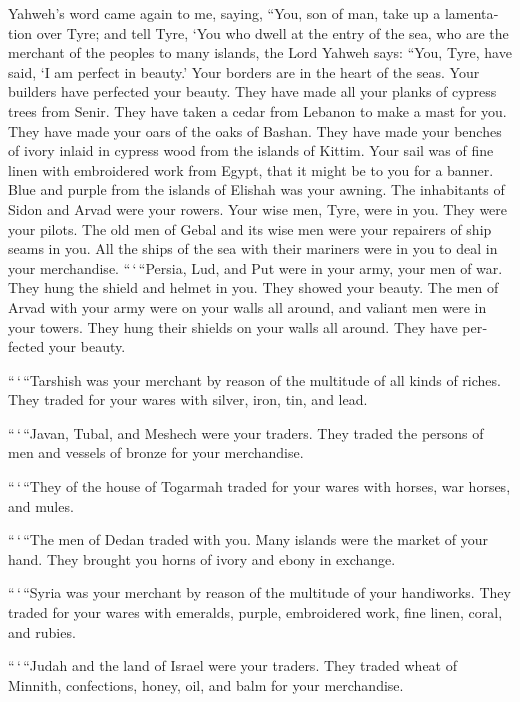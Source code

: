\begin{paracol}{2}
\begin{otherlanguage}{english}
 Yahweh's word came again to me, saying, 
``You, son of man, take up a lamentation over Tyre;  and
tell Tyre, `You who dwell at the entry of the sea, who are the merchant
of the peoples to many islands, the Lord Yahweh says: ``You, Tyre, have
said, `I am perfect in beauty.'  Your borders are in the
heart of the seas. Your builders have perfected your beauty.
 They have made all your planks of cypress trees from
Senir. They have taken a cedar from Lebanon to make a mast for you.
 They have made your oars of the oaks of Bashan. They have
made your benches of ivory inlaid in cypress wood from the islands of
Kittim.  Your sail was of fine linen with embroidered work
from Egypt, that it might be to you for a banner. Blue and purple from
the islands of Elishah was your awning.  The inhabitants
of Sidon and Arvad were your rowers. Your wise men, Tyre, were in you.
They were your pilots.  The old men of Gebal and its wise
men were your repairers of ship seams in you. All the ships of the sea
with their mariners were in you to deal in your merchandise.
 ``\,`\,``Persia, Lud, and Put were in your army, your
men of war. They hung the shield and helmet in you. They showed your
beauty.  The men of Arvad with your army were on your
walls all around, and valiant men were in your towers. They hung their
shields on your walls all around. They have perfected your beauty.

 ``\,`\,``Tarshish was your merchant by reason of the
multitude of all kinds of riches. They traded for your wares with
silver, iron, tin, and lead.

 ``\,`\,``Javan, Tubal, and Meshech were your traders.
They traded the persons of men and vessels of bronze for your
merchandise.

 ``\,`\,``They of the house of Togarmah traded for your
wares with horses, war horses, and mules.

 ``\,`\,``The men of Dedan traded with you. Many islands
were the market of your hand. They brought you horns of ivory and ebony
in exchange.

 ``\,`\,``Syria was your merchant by reason of the
multitude of your handiworks. They traded for your wares with emeralds,
purple, embroidered work, fine linen, coral, and rubies.

 ``\,`\,``Judah and the land of Israel were your traders.
They traded wheat of Minnith, confections, honey, oil, and balm for your
merchandise.


\end{otherlanguage}
\end{paracol}
